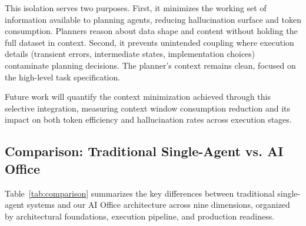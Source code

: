 \documentclass[sigconf]{acmart}
\begin{document}
This isolation serves two purposes. First, it minimizes the working set of information available to planning agents, reducing hallucination surface and token consumption. Planners reason about data shape and content without holding the full dataset in context. Second, it prevents unintended coupling where execution details (transient errors, intermediate states, implementation choices) contaminate planning decisions. The planner's context remains clean, focused on the high-level task specification.

Future work will quantify the context minimization achieved through this selective integration, measuring context window consumption reduction and its impact on both token efficiency and hallucination rates across execution stages.

\subsection{Comparison: Traditional Single-Agent vs. AI Office}
\label{sec:comparison}

Table~\ref{tab:comparison} summarizes the key differences between traditional single-agent systems and our AI Office architecture across nine dimensions, organized by architectural foundations, execution pipeline, and production readiness.
\end{document}
